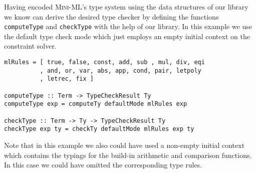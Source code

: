 Having encoded \textsc{Mini-ML}'s type system using the data
structures of our library we know can derive the desired type checker
by defining the functions \texttt{computeType} and \texttt{checkType}
with the help of our library. In this example we use the default type
check mode which just employs an empty initial context on the
constraint solver.

\smallskip

\begin{lstlisting}
mlRules = [ true, false, const, add, sub , mul, div, eqi
          , and, or, var, abs, app, cond, pair, letpoly
          , letrec, fix ]

computeType :: Term -> TypeCheckResult Ty
computeType exp = computeTy defaultMode mlRules exp

checkType :: Term -> Ty -> TypeCheckResult Ty
checkType exp ty = checkTy defaultMode mlRules exp ty
\end{lstlisting}

\bigskip

Note that in this example we also could have used a non-empty initial
context which contains the typings for the build-in arithmetic and
comparison functions. In this case we could have omitted the
corresponding type rules.